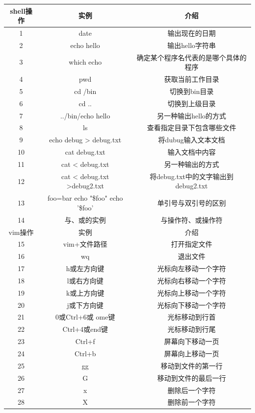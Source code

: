 \documentclass[a4paper, 12pt]{article}
\begin{document}
	\begin{tabular}{|c|c|c|}   %
		\hline
	   shell操作 &实例       & 介绍    \\
		\hline
		1  & date   &   输出现在的日期   \\
		\hline
		2  & echo hello &    输出hello字符串  \\
		\hline
		3  & which echo &确定某个程序名代表的是哪个具体的程序\\
		\hline
		4  & pwd &    获取当前工作目录 \\
		\hline
		5  & cd /bin  & 切换到bin目录 \\
		\hline
		6  & cd .. & 切换到上级目录 \\
		\hline
		7  & ../bin/echo hello   & 另一种输出hello的方式 \\
		\hline
		8 & ls & 查看指定目录下包含哪些文件 \\
		\hline
		9 & echo debug > debug.txt   & 将dubug输入文本文档 \\
		\hline
		10 & cat debug.txt & 输入文档中内容 \\
		\hline
		11 & cat < debug.txt & 另一种输出的方式 \\
		\hline
		12 & cat < debug.txt >debug2.txt&将debug.txt中的文字输出到debug2.txt \\
		\hline
    	13 & foo=bar echo "\$foo" echo '\$foo'&单引号与双引号的区别\\
		\hline
		14 & 与、或的实例 & 与操作符、或操作符  \\
		\hline
		
		vim操作 & 实例   &   介绍   \\
		\hline
		15 & vim+文件路径 & 打开指定文件 \\
		\hline
		16 & wq & 退出文件 \\
		\hline
		17 & h或左方向键 & 光标向左移动一个字符 \\
		\hline
		18 & l或右方向键 & 光标向右移动一个字符 \\
		\hline
		19 & k或上方向键 & 光标向上移动一个字符 \\
		\hline
		20 & j或下方向键 & 光标向下移动一个字符 \\
		\hline
		21 & 0或Ctrl+6或 ome键 & 光标移动到行首 \\
		\hline
		22 & Ctrl+4或end键 & 光标移动到行尾 \\
		\hline
		23 & Ctrl+f & 屏幕向下移动一页 \\
		\hline
		24 & Ctrl+b & 屏幕向上移动一页 \\
		\hline
		25 & gg & 移动到文件的第一行 \\
		\hline
		26 & G & 移动到文件的最后一行 \\
		\hline
		27 & x   & 删除后一个字符 \\
		\hline
		28 & X & 删除前一个字符 \\
		\hline
     	\end{tabular}
     	
\end{document}
